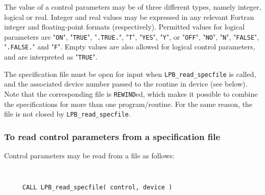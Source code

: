 \documentclass{galahad}
\newcommand{\packagename}{LPB}
\begin{document}
The value of a control parameters may be of three different types, namely
integer, logical or real.
Integer and real values may be expressed in any relevant Fortran integer and
floating-point formats (respectively). Permitted values for logical
parameters are "{\tt ON}", "{\tt TRUE}", "{\tt .TRUE.}", "{\tt T}",
"{\tt YES}", "{\tt Y}", or "{\tt OFF}", "{\tt NO}",
"{\tt N}", "{\tt FALSE}", "{\tt .FALSE.}" and "{\tt F}".
Empty values are also allowed for
logical control parameters, and are interpreted as "{\tt TRUE}".

The specification file must be open for
input when {\tt \packagename\_read\_specfile}
is called, and the associated device number
passed to the routine in device (see below).
Note that the corresponding
file is {\tt REWIND}ed, which makes it possible to combine the specifications
for more than one program/routine.  For the same reason, the file is not
closed by {\tt \packagename\_read\_specfile}.

\subsubsection{To read control parameters from a specification file}
\label{readspec}

Control parameters may be read from a file as follows:
\hskip0.5in

\def\baselinestretch{0.8}
{\tt
\begin{verbatim}
     CALL LPB_read_specfile( control, device )
\end{verbatim}
}
\def\baselinestretch{1.0}
\end{document}
